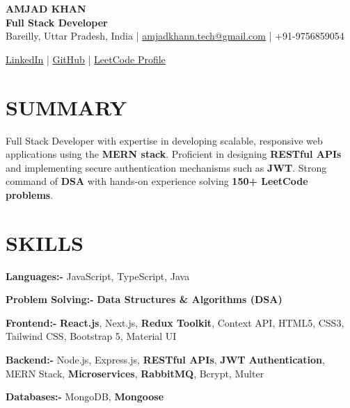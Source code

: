 \documentclass[10pt,a4paper]{article}
\begin{document}
\begin{center}

    {\LARGE \textbf{AMJAD KHAN}} \\[3pt]

    {\large \textbf{Full Stack Developer}} \\[5pt]

    Bareilly, Uttar Pradesh, India
    \quad | \quad
    \href{mailto:amjadkhann.tech@gmail.com}
    {amjadkhann.tech@gmail.com}
    \quad | \quad
    +91-9756859054

    

    \href{https://www.linkedin.com/in/amjad-khan-209363320/}
    {LinkedIn}
    \quad | \quad
    \href{https://github.com/Amjadkhan9756}
    {GitHub}
    \quad | \quad
    \href{https://leetcode.com/u/amjadkhan9756/}
    {LeetCode Profile}

\end{center}

\vspace{2pt}

\section*{SUMMARY}

Full Stack Developer with expertise in developing scalable, responsive web applications using the \textbf{MERN stack}. Proficient in designing \textbf{RESTful APIs} and implementing secure authentication mechanisms such as \textbf{JWT}. Strong command of \textbf{DSA} with hands-on experience solving \textbf{150+ LeetCode problems}.

\section*{SKILLS}

\textbf{Languages:-}
JavaScript, TypeScript, Java

\textbf{Problem Solving:-}
\textbf{Data Structures \& Algorithms (DSA)}

\textbf{Frontend:-}
\textbf{React.js}, Next.js,\textbf{ Redux Toolkit}, Context API, HTML5, CSS3, Tailwind CSS, Bootstrap 5, Material UI

\textbf{Backend:-}
Node.js, Express.js, \textbf{RESTful APIs}, \textbf{JWT Authentication}, MERN Stack, \textbf{Microservices}, \textbf{RabbitMQ}, Bcrypt, Multer

\textbf{Databases:-}
MongoDB, \textbf{Mongoose}
\end{document}
